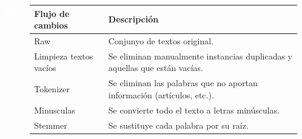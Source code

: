 \documentclass[25pt,landscape]{tikzposter}
\begin{document}
\begin{columns}
{\begin{minipage}[t]{0.45\linewidth}
	\end{minipage}
	\begin{adjustbox}{valign=t}
	\begin{minipage}[t]{0.2\linewidth}
	\end{minipage}
	 \textcolor{white}{XD} %
	\end{adjustbox}
	\begin{adjustbox}{valign=t}
	\begin{minipage}[t]{0.3\linewidth}
	\begin{tikzfigure}
	\begin{tabular}{|l|l|}
	\hline
	\textbf{Flujo de cambios} & \textbf{Descripción} \\ \hline
	Raw 					& Conjunyo de textos original. \\
	Limpieza textos vacíos 	& Se eliminan manualmente instancias duplicadas y aquellas que están vacías.\\
	Tokenizer 				& Se eliminan las palabras que no aportan información (artículos, etc.).\\
	Minusculas 				& Se convierte todo el texto a letras minúsculas. \\
	Stemmer 				& Se sustituye cada palabra por su raíz. \\ \hline
	\end{tabular}
	\end{tikzfigure}
	\end{minipage}\\
	\end{adjustbox}
	}	
\end{columns}	
\end{document}
